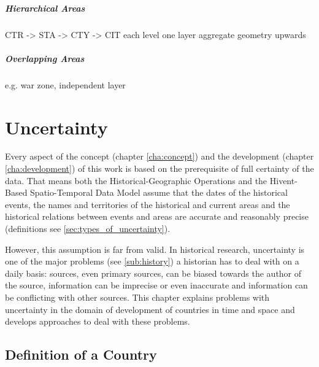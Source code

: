 \paragraph{Hierarchical Areas} %
\label{par:hierarchical_areas}

CTR -> STA -> CTY -> CIT
each level one layer
aggregate geometry upwards


\paragraph{Overlapping Areas} %
\label{par:overlapping_areas}

e.g. war zone,
independent layer





\chapter{Uncertainty} %
\label{cha:uncertainty}

Every aspect of the concept (chapter \ref{cha:concept}) and the development (chapter \ref{cha:development}) of this work is based on the prerequisite of full certainty of the data. That means both the Historical-Geographic Operations and the Hivent-Based Spatio-Temporal Data Model assume that the dates of the historical events, the names and territories of the historical and current areas and the historical relations between events and areas are accurate and reasonably precise (definitions see \ref{sec:types_of_uncertainty}).

However, this assumption is far from valid. In historical research, uncertainty is one of the major problems (see \ref{sub:history}) a historian has to deal with on a daily basis: sources, even primary sources, can be biased towards the author of the source, information can be imprecise or even inaccurate and information can be conflicting with other sources. This chapter explains problems with uncertainty in the domain of development of countries in time and space and develops approaches to deal with these problems.


\section{Definition of a Country} %
\label{sec:definition_of_a_country}

